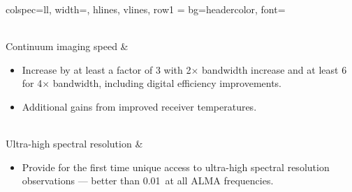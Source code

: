 \begin{talltblr}[caption={Improvements provided by the Wideband Sensitivity Upgrade},label=tab:improvements]{
  colspec={ll},
  width=\textwidth,
  hlines,
  vlines,
  row{1} = {bg=headercolor, font=\bfseries}
  }
\begin{minipage}{11.2cm}
\end{minipage}\\
%
Continuum imaging speed         & 
\begin{minipage}{11.2cm}
\begin{itemize}[leftmargin=0.3cm]
\item Increase by at least a factor of 3 with 2$\times$ bandwidth increase and at least 6 for 4$\times$ bandwidth, including digital efficiency improvements.
\item Additional gains from improved receiver temperatures.
\end{itemize}
\end{minipage}\\
%
Ultra-high spectral resolution  &
\begin{minipage}{11.2cm}
\begin{itemize}[leftmargin=0.3cm]
\item Provide for the first time unique access to ultra-high spectral resolution observations --- better than 0.01\kms\ at all ALMA frequencies.
\end{itemize}
\end{minipage}
\end{talltblr}